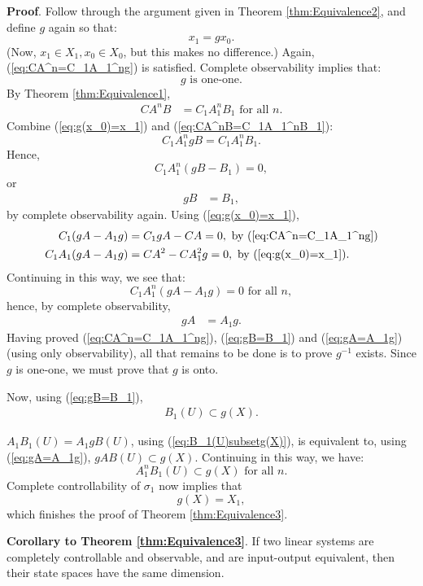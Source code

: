 \documentclass[12pt]{book}
\theoremstyle{plain}
\theoremstyle{definition}
\begin{document}
\textbf{Proof}.
Follow through the argument given in Theorem \ref{thm:Equivalence2}, and define $g$ again so that:
$$x_1 = gx_0.$$
(Now, $x_1 \in X_1, x_0 \in X_0$, but this makes no difference.)
Again, (\ref{eq:CA^n=C_1A_1^ng}) is satisfied.
Complete observability implies that:
$$g \text{ is one-one}.$$
By Theorem \ref{thm:Equivalence1},
\begin{align} \label{eq:CA^nB=C_1A_1^nB_1}
    CA^nB &= C_1A_1^nB_1 \text{ for all } n.
\end{align}
Combine (\ref{eq:g(x_0)=x_1}) and (\ref{eq:CA^nB=C_1A_1^nB_1}):
$$C_1A_1^ngB = C_1A_1^nB_1.$$
Hence,
$$C_1A_1^n(gB-B_1) = 0,$$
or
\begin{align} \label{eq:gB=B_1}
    gB &= B_1,
\end{align}
by complete observability again.
Using (\ref{eq:g(x_0)=x_1}),
\begin{align*}
\begin{split}
    C_1(gA - A_1g) &= C_1gA - CA = 0, \text{ by } (\ref{eq:CA^n=C_1A_1^ng}) \\
    C_1A_1(gA - A_1g) &= CA^2 - CA_1^2g = 0, \text{ by } (\ref{eq:g(x_0)=x_1}).
\end{split}
\end{align*}
Continuing in this way, we see that:
$$C_1A_1^n(gA - A_1g) = 0 \text{ for all } n,$$
hence, by complete observability,
\begin{align} \label{eq:gA=A_1g}
    gA &= A_1g.
\end{align}
Having proved (\ref{eq:CA^n=C_1A_1^ng}), (\ref{eq:gB=B_1}) and (\ref{eq:gA=A_1g}) (using only observability), all that remains to be done is to prove $g^{-1}$ exists.
Since $g$ is one-one, we must prove that $g$ is onto.

Now, using (\ref{eq:gB=B_1}),
\begin{align} \label{eq:B_1(U)subsetg(X)}
    B_1(U) \subset g(X).
\end{align}

$A_1B_1(U) = A_1gB(U)$, using (\ref{eq:B_1(U)subsetg(X)}), is equivalent to, using (\ref{eq:gA=A_1g}), $gAB(U) \subset g(X)$.
Continuing in this way, we have:
$$A_1^nB_1(U) \subset g(X) \text{ for all } n.$$
Complete controllability of $\sigma_1$ now implies that
$$g(X) = X_1,$$
which finishes the proof of Theorem \ref{thm:Equivalence3}.

\textbf{Corollary to Theorem \ref{thm:Equivalence3}}.
If two linear systems are completely controllable and observable, and are input-output equivalent, then their state spaces have the same dimension.
\end{document}
